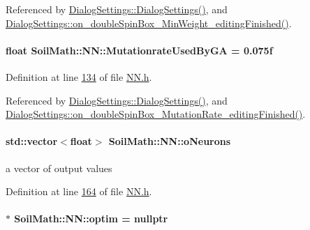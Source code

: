 Referenced by \hyperlink{dialogsettings_8cpp_source_l00005}{Dialog\+Settings\+::\+Dialog\+Settings()}, and \hyperlink{dialogsettings_8cpp_source_l00445}{Dialog\+Settings\+::on\+\_\+double\+Spin\+Box\+\_\+\+Min\+Weight\+\_\+editing\+Finished()}.

\hypertarget{class_soil_math_1_1_n_n_a4969171a8362796a1633b1ac1f11ba74}{}
\paragraph[{Mutationrate\+Used\+By\+G\+A}]{\setlength{\rightskip}{0pt plus 5cm}float Soil\+Math\+::\+N\+N\+::\+Mutationrate\+Used\+By\+G\+A = 0.\+075f}\label{class_soil_math_1_1_n_n_a4969171a8362796a1633b1ac1f11ba74}


Definition at line \hyperlink{_n_n_8h_source_l00134}{134} of file \hyperlink{_n_n_8h_source}{N\+N.\+h}.



Referenced by \hyperlink{dialogsettings_8cpp_source_l00005}{Dialog\+Settings\+::\+Dialog\+Settings()}, and \hyperlink{dialogsettings_8cpp_source_l00429}{Dialog\+Settings\+::on\+\_\+double\+Spin\+Box\+\_\+\+Mutation\+Rate\+\_\+editing\+Finished()}.

\hypertarget{class_soil_math_1_1_n_n_a50a52b41982f6845dc5294f17607774b}{}
\paragraph[{o\+Neurons}]{\setlength{\rightskip}{0pt plus 5cm}std\+::vector$<$float$>$ Soil\+Math\+::\+N\+N\+::o\+Neurons\hspace{0.3cm}{\ttfamily [private]}}\label{class_soil_math_1_1_n_n_a50a52b41982f6845dc5294f17607774b}
a vector of output values 

Definition at line \hyperlink{_n_n_8h_source_l00164}{164} of file \hyperlink{_n_n_8h_source}{N\+N.\+h}.

\hypertarget{class_soil_math_1_1_n_n_a88b760a795d84bf6e1c99c7620200c43}{}
\paragraph[{optim}]{$\ast$ Soil\+Math\+::\+N\+N\+::optim = nullptr\hspace{0.3cm}{\ttfamily [private]}}\label{class_soil_math_1_1_n_n_a88b760a795d84bf6e1c99c7620200c43}



